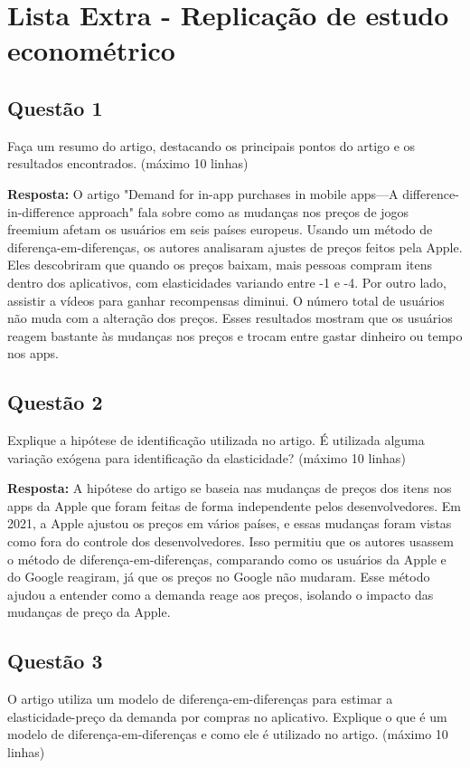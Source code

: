 \section{Lista Extra - Replicação de estudo econométrico}

\subsection{Questão 1}
Faça um resumo do artigo, destacando os principais pontos do artigo e os resultados encontrados. (máximo 10 linhas)

\textbf{Resposta:} O artigo "Demand for in-app purchases in mobile apps—A difference-in-difference approach"  fala sobre como as mudanças nos preços de jogos freemium afetam os usuários em seis países europeus. Usando um método de diferença-em-diferenças, os autores analisaram ajustes de preços feitos pela Apple. Eles descobriram que quando os preços baixam, mais pessoas compram itens dentro dos aplicativos, com elasticidades variando entre -1 e -4. Por outro lado, assistir a vídeos para ganhar recompensas diminui. O número total de usuários não muda com a alteração dos preços. Esses resultados mostram que os usuários reagem bastante às mudanças nos preços e trocam entre gastar dinheiro ou tempo nos apps.

\subsection{Questão 2}
Explique a hipótese de identificação utilizada no artigo. É utilizada alguma variação exógena para identificação da elasticidade? (máximo 10 linhas)

\textbf{Resposta:} A hipótese do artigo se baseia nas mudanças de preços dos itens nos apps da Apple que foram feitas de forma independente pelos desenvolvedores. Em 2021, a Apple ajustou os preços em vários países, e essas mudanças foram vistas como fora do controle dos desenvolvedores. Isso permitiu que os autores usassem o método de diferença-em-diferenças, comparando como os usuários da Apple e do Google reagiram, já que os preços no Google não mudaram. Esse método ajudou a entender como a demanda reage aos preços, isolando o impacto das mudanças de preço da Apple.

\subsection{Questão 3}
O artigo utiliza um modelo de diferença-em-diferenças para estimar a elasticidade-preço da demanda por compras no aplicativo. Explique o que é um modelo de diferença-em-diferenças e como ele é utilizado no artigo. (máximo 10 linhas)

